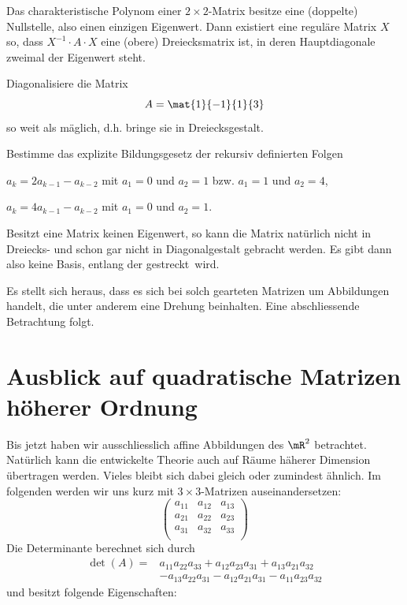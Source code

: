 \documentclass[%
11pt,%
twoside,%
titlepage,%
german,%
headsepline%
]{scrartcl}
\begin{document}
\begin{satz}
Das charakteristische Polynom einer $2 \times 2$-Matrix besitze eine (doppelte) Nullstelle, also einen einzigen Eigenwert. Dann existiert eine reguläre Matrix $X$ so, dass $X^{-1}\cdot A\cdot X$ eine (obere) Dreiecksmatrix ist, in deren Hauptdiagonale zweimal der Eigenwert steht.
\end{satz}

\begin{ueb}
Diagonalisiere die Matrix
$$A=\mat{1}{-1}{1}{3}$$
so weit als mäglich, d.h. bringe sie in Dreiecksgestalt.
\end{ueb}

\begin{ueb}
Bestimme das explizite Bildungsgesetz der rekursiv definierten Folgen
\begin{enumeratea}
\item $a_k=2a_{k-1}-a_{k-2}$ mit $a_1=0$ und $a_2=1$ bzw. $a_1=1$ und $a_2=4$,
\item $a_k=4a_{k-1}-a_{k-2}$ mit $a_1=0$ und $a_2=1$.
\end{enumeratea}
\end{ueb}

\begin{bem}
Besitzt eine Matrix keinen Eigenwert, so kann die Matrix natürlich nicht in Dreiecks- und schon gar nicht in Diagonalgestalt gebracht werden. Es gibt dann also keine Basis, entlang der \glqq gestreckt\grqq\ wird.

Es stellt sich heraus, dass es sich bei solch gearteten Matrizen um Abbildungen handelt, die unter anderem eine Drehung beinhalten. Eine abschliessende Betrachtung folgt.
\end{bem}

\newpage

\appendix

\section{Ausblick auf quadratische Matrizen höherer Ordnung}

Bis jetzt haben wir ausschliesslich affine Abbildungen des $\mR^2$ betrachtet. Natürlich kann die entwickelte Theorie auch auf Räume häherer Dimension übertragen werden. Vieles bleibt sich dabei gleich oder zumindest ähnlich. Im folgenden werden wir uns kurz mit $3 \times 3$-Matrizen auseinandersetzen:
$$\begin{pmatrix}
a_{11}&a_{12}&a_{13}\\
a_{21}&a_{22}&a_{23}\\
a_{31}&a_{32}&a_{33}\\
\end{pmatrix}$$
Die Determinante berechnet sich durch
\begin{align*}
\det(A)=&a_{11}a_{22}a_{33}+a_{12}a_{23}a_{31}+a_{13}a_{21}a_{32}\\
&-a_{13}a_{22}a_{31}-a_{12}a_{21}a_{31}-a_{11}a_{23}a_{32}
\end{align*}
und besitzt folgende Eigenschaften:
\end{document}
